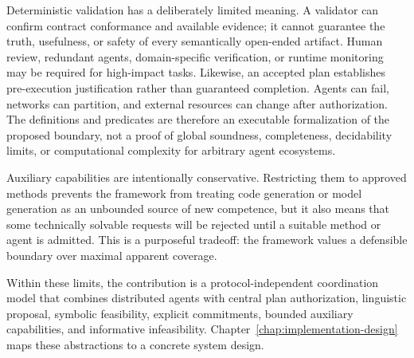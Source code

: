 Deterministic validation has a deliberately limited meaning. A validator can confirm contract conformance and available evidence; it cannot guarantee the truth, usefulness, or safety of every semantically open-ended artifact. Human review, redundant agents, domain-specific verification, or runtime monitoring may be required for high-impact tasks. Likewise, an accepted plan establishes pre-execution justification rather than guaranteed completion. Agents can fail, networks can partition, and external resources can change after authorization. The definitions and predicates are therefore an executable formalization of the proposed boundary, not a proof of global soundness, completeness, decidability limits, or computational complexity for arbitrary agent ecosystems.

Auxiliary capabilities are intentionally conservative. Restricting them to approved methods prevents the framework from treating code generation or model generation as an unbounded source of new competence, but it also means that some technically solvable requests will be rejected until a suitable method or agent is admitted. This is a purposeful tradeoff: the framework values a defensible boundary over maximal apparent coverage.

Within these limits, the contribution is a protocol-independent coordination model that combines distributed agents with central plan authorization, linguistic proposal, symbolic feasibility, explicit commitments, bounded auxiliary capabilities, and informative infeasibility. Chapter~\ref{chap:implementation-design} maps these abstractions to a concrete system design.
